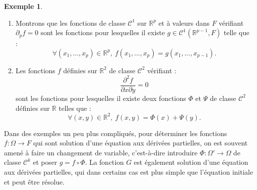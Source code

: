 \documentclass[french]{article}
\newcommand{\R}{\mathbb{R}}
\theoremstyle{plain}
\theoremstyle{definition}
\newtheorem*{ex}{Exemple}
\theoremstyle{remark}
\begin{document}
\begin{ex}
	\begin{enumerate}
		\item Montrons que les fonctions de classe $\mathcal{C}^1$ sur $\R^p$ et à valeurs dans $F$ vérifiant $\partial_pf=0$ sont les fonctions pour lesquelles il existe $g\in\mathcal{C}^1(\R^{p-1},F)$ telle que :
		$$\forall (x_1,\ldots,x_p)\in\R^p,\ f(x_1,\ldots,x_p)=g(x_1,\ldots,x_{p-1}).$$
		\item Les fonctions $f$ définies sur $\R^2$ de classe $\mathcal{C}^2$ vérifiant :
		$$\frac{\partial^2f}{\partial x\partial y}=0$$ sont les fonctions pour lesquelles il existe deux fonctions $\Phi$ et $\Psi$ de classe $\mathcal{C}^2$ définies sur $\R$ telles que :
		$$\forall(x,y)\in\R^2,\ f(x,y)=\Phi(x)+\Psi(y).$$
	\end{enumerate}
\end{ex}

Dans des exemples un peu plus compliqués, pour déterminer les fonctions $f:\Omega\to F$ qui sont solution d'une équation aux dérivées partielles, on est souvent amené à faire un changement de variable, c'est-à-dire introduire $\Phi:\Omega'\to\Omega$ de classe $\mathcal{C}^k$ et poser $g=f\circ\Phi$. La fonction $G$ est également solution d'une équation aux dérivées partielles, qui dans certains cas est plus simple que l'équation initiale et peut être résolue.
\end{document}
